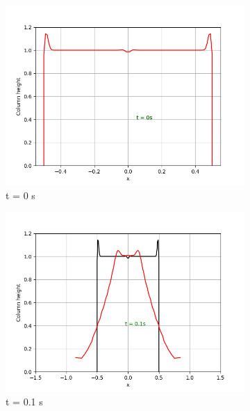 \documentclass{article}
\begin{document}
\begin{figure}[!htbp]
\centering
\begin{subfigure}{.5\textwidth}
  \centering
  \includegraphics[width=1.1\linewidth]{circ_dam_t0.png}
  \caption{t = 0 s}
  \label{fig:sub1}
\end{subfigure}%
\begin{subfigure}{.5\textwidth}
  \centering
  \includegraphics[width=1.1\linewidth]{circ_dam_t1.png}
  \caption{t = 0.1 s}
  \label{fig:sub2}
\end{subfigure}
\begin{subfigure}{.5\textwidth}
  \centering

\end{subfigure}
\end{figure}
\end{document}

